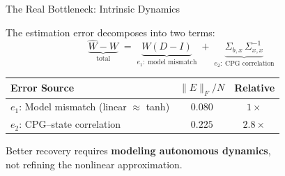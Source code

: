 \documentclass[aspectratio=169,12pt]{beamer}
\begin{document}
\begin{frame}{The Real Bottleneck: Intrinsic Dynamics}

The estimation error decomposes into two terms:
\[
  \underbrace{\hat{W} - W}_{\text{total}}
  \;=\;
  \underbrace{W(D - I)}_{e_1:\;\text{model mismatch}}
  \;+\;
  \underbrace{\Sigma_{b,x}\,\Sigma_{x,x}^{-1}}_{e_2:\;\text{CPG correlation}}
\]

\vspace{4pt}
\begin{center}
\renewcommand{\arraystretch}{1.3}
\begin{tabular}{lcc}
  \toprule
  \textbf{Error Source} & $\|E\|_F / N$ & \textbf{Relative} \\
  \midrule
  $e_1$: Model mismatch (linear $\approx$ tanh) & $0.080$ & $1\times$ \\
  \rowcolor{accentred!15}
  $e_2$: CPG--state correlation & $0.225$ & $\mathbf{2.8\times}$ \\
  \bottomrule
\end{tabular}
\end{center}

\vspace{6pt}
\begin{center}
  {\color{mainblue}
    Better recovery requires \textbf{modeling autonomous dynamics},\\
    not refining the nonlinear approximation.}
\end{center}

\end{frame}
\end{document}
